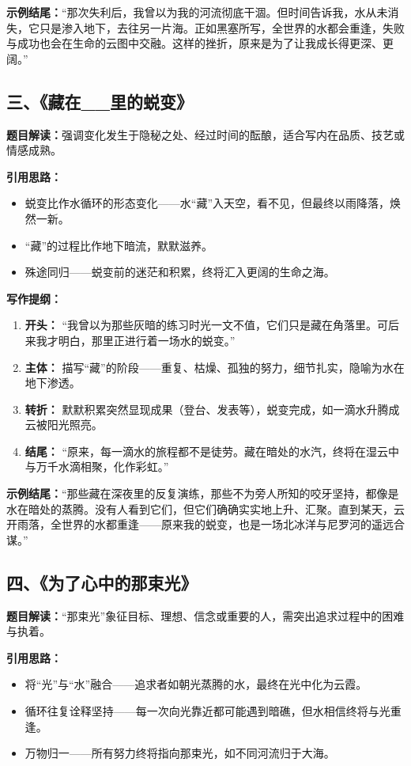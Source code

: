 \textbf{示例结尾：}“那次失利后，我曾以为我的河流彻底干涸。但时间告诉我，水从未消失，它只是渗入地下，去往另一片海。正如黑塞所写，全世界的水都会重逢，失败与成功也会在生命的云图中交融。这样的挫折，原来是为了让我成长得更深、更阔。”


\subsection*{三、《藏在\_\_里的蜕变》}

\textbf{题目解读：}强调变化发生于隐秘之处、经过时间的酝酿，适合写内在品质、技艺或情感成熟。

\textbf{引用思路：}
\begin{itemize}
    \item 蜕变比作水循环的形态变化——水“藏”入天空，看不见，但最终以雨降落，焕然一新。
    \item “藏”的过程比作地下暗流，默默滋养。
    \item 殊途同归——蜕变前的迷茫和积累，终将汇入更阔的生命之海。
\end{itemize}

\textbf{写作提纲：}
\begin{enumerate}
    \item \textbf{开头：} “我曾以为那些灰暗的练习时光一文不值，它们只是藏在角落里。可后来我才明白，那里正进行着一场水的蜕变。”
    \item \textbf{主体：} 描写“藏”的阶段——重复、枯燥、孤独的努力，细节扎实，隐喻为水在地下渗透。
    \item \textbf{转折：} 默默积累突然显现成果（登台、发表等），蜕变完成，如一滴水升腾成云被阳光照亮。
    \item \textbf{结尾：} “原来，每一滴水的旅程都不是徒劳。藏在暗处的水汽，终将在湿云中与万千水滴相聚，化作彩虹。”
\end{enumerate}

\textbf{示例结尾：}“那些藏在深夜里的反复演练，那些不为旁人所知的咬牙坚持，都像是水在暗处的蒸腾。没有人看到它们，但它们确确实实地上升、汇聚。直到某天，云开雨落，全世界的水都重逢——原来我的蜕变，也是一场北冰洋与尼罗河的遥远合谋。”


\subsection*{四、《为了心中的那束光》}

\textbf{题目解读：}“那束光”象征目标、理想、信念或重要的人，需突出追求过程中的困难与执着。

\textbf{引用思路：}
\begin{itemize}
    \item 将“光”与“水”融合——追求者如朝光蒸腾的水，最终在光中化为云霞。
    \item 循环往复诠释坚持——每一次向光靠近都可能遇到暗礁，但水相信终将与光重逢。
    \item 万物归一——所有努力终将指向那束光，如不同河流归于大海。
\end{itemize}


